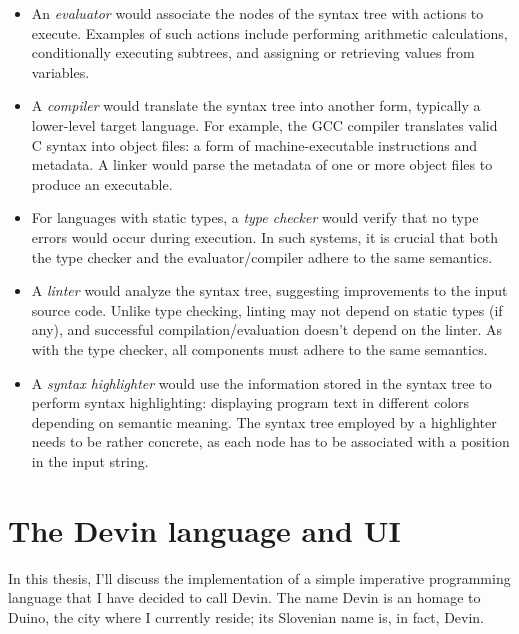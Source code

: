 \documentclass[UdineBachThesis,american,11pt]{PhdThesis}
\begin{document}
  \begin{itemize}
    \item An \emph{evaluator} would associate the nodes of the syntax tree with
    actions to execute. Examples of such actions include performing arithmetic
    calculations, conditionally executing subtrees, and assigning or retrieving
    values from variables.

    \item A \emph{compiler} would translate the syntax tree into another form,
    typically a lower-level target language. For example, the GCC compiler
    translates valid C syntax into object files: a form of machine-executable
    instructions and metadata. A linker would parse the metadata of one or more
    object files to produce an executable.

    \item For languages with static types, a \emph{type checker} would verify
    that no type errors would occur during execution. In such systems, it is
    crucial that both the type checker and the evaluator/compiler adhere to the
    same semantics.

    \item A \emph{linter} would analyze the syntax tree, suggesting improvements
    to the input source code. Unlike type checking, linting may not depend on
    static types (if any), and successful compilation/evaluation doesn't depend
    on the linter. As with the type checker, all components must adhere to the
    same semantics.

    \item A \emph{syntax highlighter} would use the information stored in the
    syntax tree to perform syntax highlighting: displaying program text in
    different colors depending on semantic meaning. The syntax tree employed by
    a highlighter needs to be rather concrete, as each node has to be associated
    with a position in the input string.
  \end{itemize}

  \newpage
  \thispagestyle{empty}

  \chapter{The Devin language and UI}

  In this thesis, I'll discuss the implementation of a simple imperative
  programming language that I have decided to call Devin. The name Devin is an
  homage to Duino, the city where I currently reside; its Slovenian name is, in
  fact, Devin.
\end{document}
